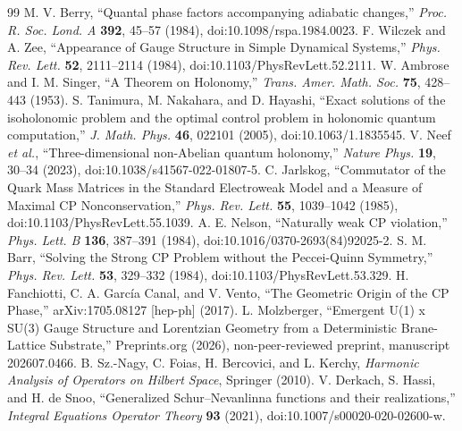 \documentclass[11pt]{article}
\theoremstyle{remark}\newtheorem{remark}{Remark}
\begin{document}
\begin{thebibliography}{99}
 M. V. Berry, ``Quantal phase factors accompanying adiabatic changes,'' \emph{Proc. R. Soc. Lond. A} \textbf{392}, 45--57 (1984), doi:10.1098/rspa.1984.0023.
 F. Wilczek and A. Zee, ``Appearance of Gauge Structure in Simple Dynamical Systems,'' \emph{Phys. Rev. Lett.} \textbf{52}, 2111--2114 (1984), doi:10.1103/PhysRevLett.52.2111.
 W. Ambrose and I. M. Singer, ``A Theorem on Holonomy,'' \emph{Trans. Amer. Math. Soc.} \textbf{75}, 428--443 (1953).
 S. Tanimura, M. Nakahara, and D. Hayashi, ``Exact solutions of the isoholonomic problem and the optimal control problem in holonomic quantum computation,'' \emph{J. Math. Phys.} \textbf{46}, 022101 (2005), doi:10.1063/1.1835545.
 V. Neef \emph{et al.}, ``Three-dimensional non-Abelian quantum holonomy,'' \emph{Nature Phys.} \textbf{19}, 30--34 (2023), doi:10.1038/s41567-022-01807-5.
 C. Jarlskog, ``Commutator of the Quark Mass Matrices in the Standard Electroweak Model and a Measure of Maximal CP Nonconservation,'' \emph{Phys. Rev. Lett.} \textbf{55}, 1039--1042 (1985), doi:10.1103/PhysRevLett.55.1039.
 A. E. Nelson, ``Naturally weak CP violation,'' \emph{Phys. Lett. B} \textbf{136}, 387--391 (1984), doi:10.1016/0370-2693(84)92025-2.
 S. M. Barr, ``Solving the Strong CP Problem without the Peccei-Quinn Symmetry,'' \emph{Phys. Rev. Lett.} \textbf{53}, 329--332 (1984), doi:10.1103/PhysRevLett.53.329.
 H. Fanchiotti, C. A. Garc\'ia Canal, and V. Vento, ``The Geometric Origin of the CP Phase,'' arXiv:1705.08127 [hep-ph] (2017).
 L. Molzberger, ``Emergent U(1) x SU(3) Gauge Structure and Lorentzian Geometry from a Deterministic Brane-Lattice Substrate,'' Preprints.org (2026), non-peer-reviewed preprint, manuscript 202607.0466.
 B. Sz.-Nagy, C. Foias, H. Bercovici, and L. Kerchy, \emph{Harmonic Analysis of Operators on Hilbert Space}, Springer (2010).
 V. Derkach, S. Hassi, and H. de Snoo, ``Generalized Schur--Nevanlinna functions and their realizations,'' \emph{Integral Equations Operator Theory} \textbf{93} (2021), doi:10.1007/s00020-020-02600-w.
\end{thebibliography}
\end{document}
